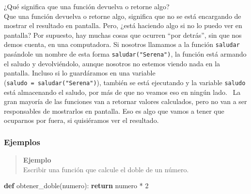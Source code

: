 \documentclass[
  letterpaper,
  DIV=11,
  numbers=noendperiod]{scrreprt}
\newenvironment{Shaded}{\begin{snugshade}}{\end{snugshade}}
\newcommand{\ControlFlowTok}[1]{\textcolor[rgb]{0.00,0.23,0.31}{\textbf{#1}}}
\newcommand{\DecValTok}[1]{\textcolor[rgb]{0.68,0.00,0.00}{#1}}
\newcommand{\KeywordTok}[1]{\textcolor[rgb]{0.00,0.23,0.31}{\textbf{#1}}}
\newcommand{\NormalTok}[1]{\textcolor[rgb]{0.00,0.23,0.31}{#1}}
\newcommand{\OperatorTok}[1]{\textcolor[rgb]{0.37,0.37,0.37}{#1}}
\begin{document}
\begin{tcolorbox}[enhanced jigsaw, opacitybacktitle=0.6, toptitle=1mm, toprule=.15mm, arc=.35mm, breakable, bottomrule=.15mm, opacityback=0, leftrule=.75mm, rightrule=.15mm, title=\textcolor{quarto-callout-note-color}{\faInfo}\hspace{0.5em}{Return vs Print}, left=2mm, bottomtitle=1mm, colframe=quarto-callout-note-color-frame, colback=white, titlerule=0mm, coltitle=black, colbacktitle=quarto-callout-note-color!10!white]

¿Qué significa que una función devuelva o retorne algo?\\
Que una función devuelva o retorne algo, significa que no se está
encargando de mostrar el resultado en pantalla. Pero, ¿está haciendo
algo si no lo puedo ver en pantalla? Por supuesto, hay muchas cosas que
ocurren ``por detrás'', sin que nos demos cuenta, en una computadora. Si
nosotros llamamos a la función \texttt{saludar} pasándole un nombre de
esta forma \texttt{saludar("Serena")}, la función está armando el saludo
y devolviéndolo, aunque nosotros no estemos viendo nada en la pantalla.
Incluso si lo guardáramos en una variable
(\texttt{saludo\ =\ saludar("Serena")}), también se está ejecutando y la
variable \texttt{saludo} está almacenando el saludo, por más de que no
veamos eso en ningún lado.~ La gran mayoría de las funciones van a
retornar valores calculados, pero no van a ser responsables de
mostrarlos en pantalla. Eso es algo que vamos a tener que ocuparnos por
fuera, si quisiéramos ver el resultado.

\end{tcolorbox}

\subsubsection{Ejemplos}\label{ejemplos}

\begin{quote}
\textbf{Ejemplo}\\
Escribir una función que calcule el doble de un número.
\end{quote}

\begin{Shaded}
\begin{Highlighting}[]
\KeywordTok{def}\NormalTok{ obtener\_doble(numero):}
  \ControlFlowTok{return}\NormalTok{ numero }\OperatorTok{*} \DecValTok{2}
\end{Highlighting}
\end{Shaded}
\end{document}
